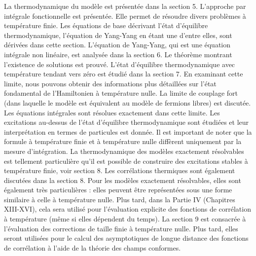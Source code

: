 La thermodynamique du modèle est présentée dans la section 5. L'approche par intégrale fonctionnelle est présentée. Elle permet de résoudre divers problèmes à température finie. Les équations de base décrivant l'état d'équilibre thermodynamique, l'équation de Yang-Yang en étant une d'entre elles, sont dérivées dans cette section. L'équation de Yang-Yang, qui est une équation intégrale non linéaire, est analysée dans la section 6. Le théorème montrant l'existence de solutions est prouvé. L'état d'équilibre thermodynamique avec température tendant vers zéro est étudié dans la section 7. En examinant cette limite, nous pouvons obtenir des informations plus détaillées sur l'état fondamental de l'Hamiltonien à température nulle. La limite de couplage fort (dans laquelle le modèle est équivalent au modèle de fermions libres) est discutée. Les équations intégrales sont résolues exactement dans cette limite. Les excitations au-dessus de l'état d'équilibre thermodynamique sont étudiées et leur interprétation en termes de particules est donnée. Il est important de noter que la formule à température finie et à température nulle diffèrent uniquement par la mesure d'intégration. La thermodynamique des modèles exactement résolvables est tellement particulière qu'il est possible de construire des excitations stables à température finie, voir section 8. Les corrélations thermiques sont également discutées dans la section 8. Pour les modèles exactement résolvables, elles sont également très particulières : elles peuvent être représentées sous une forme similaire à celle à température nulle. Plus tard, dans la Partie IV (Chapitres XIII-XVI), cela sera utilisé pour l'évaluation explicite des fonctions de corrélation à température (même si elles dépendent du temps). La section 9 est consacrée à l'évaluation des corrections de taille finie à température nulle. Plus tard, elles seront utilisées pour le calcul des asymptotiques de longue distance des fonctions de corrélation à l'aide de la théorie des champs conformes.